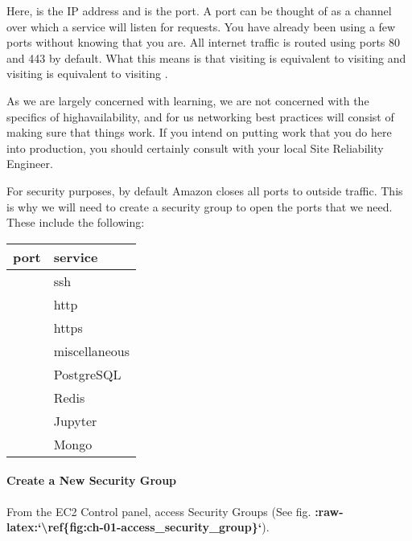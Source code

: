 \documentclass[letterpaper,10pt,english]{sphinxmanual}
\begin{document}
Here,  is the IP address and  is the port. A
port can be thought of as a channel over which a service will listen for
requests. You have already been using a few ports without knowing that
you are. All internet traffic is routed using ports 80 and 443 by
default. What this means is that visiting  is
equivalent to visiting  and visiting
 is equivalent to visiting .

As we are largely concerned with learning, we are not concerned with the
specifics of high\textendash{}availability, and for us networking best practices
will consist of making sure that things work. If you intend on putting
work that you do here into production, you should certainly consult with
your local Site Reliability Engineer.

For security purposes, by default Amazon closes all ports to outside
traffic. This is why we will need to create a security group to open the
ports that we need. These include the following:


\begin{savenotes}\sphinxattablestart
\centering
\begin{tabulary}{\linewidth}[t]{|T|T|}
\hline
\sphinxstyletheadfamily 
port
&\sphinxstyletheadfamily 
service
\\
\hline
{}
&
ssh
\\
\hline
{}
&
http
\\
\hline
{}
&
https
\\
\hline
{}
&
miscellaneous
\\
\hline
{}
&
PostgreSQL
\\
\hline
{}
&
Redis
\\
\hline
{}
&
Jupyter
\\
\hline
{}
&
Mongo
\\
\hline
\end{tabulary}
\par
\sphinxattableend\end{savenotes}


\paragraph{Create a New Security Group}
\label{\detokenize{01-amazon-web-services:Create-a-New-Security-Group}}
From the EC2 Control panel, access Security Groups (See fig.
{\color{red}\bfseries{}:raw-latex:{}`\textbackslash{}ref\{fig:ch-01-access\_security\_group\}{}`}).
\end{document}
